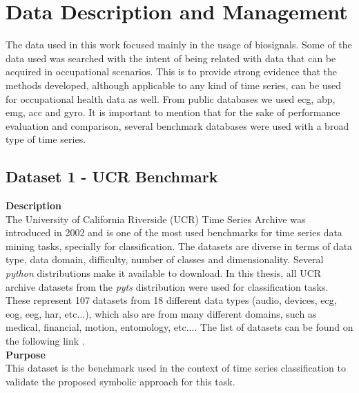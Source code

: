 
%

\chapter{Data Description and Management}
\label{cha:data}

The data used in this work focused mainly in the usage of biosignals. Some of the data used was searched with the intent of being related with data that can be acquired in occupational scenarios. This is to provide strong evidence that the methods developed, although applicable to any kind of time series, can be used for occupational health data as well. From public databases we used \gls{ecg}, \gls{abp}, \gls{emg}, \gls{acc} and \gls{gyro}. It is important to mention that for the sake of performance evaluation and comparison, several benchmark databases were used with a broad type of time series.

\section{Dataset 1 - UCR Benchmark}
\label{sec:dat_ucr}
\textbf{Description}\hfill\\
The University of California Riverside (UCR) Time Series Archive was introduced in 2002 and is one of the most used benchmarks for time series data mining tasks, specially for classification. The datasets are diverse in terms of data type, data domain, difficulty, number of classes and dimensionality\cite{ucr}. Several \textit{python} distributions make it available to download. In this thesis, all UCR archive datasets from the \textit{pyts} distribution were used for classification tasks. These represent 107 datasets from 18 different data types (audio, devices, \gls{ecg}, \gls{eog}, \gls{eeg}, \gls{har}, etc...), which also are from many different domains, such as medical, financial, motion, entomology, etc...\cite{ucr}. The list of datasets can be found on the following link \cite{ucr_site}.\\
\textbf{Purpose}\hfill\\
This dataset is the benchmark used in the context of time series classification to validate the proposed symbolic approach for this task. 
 
